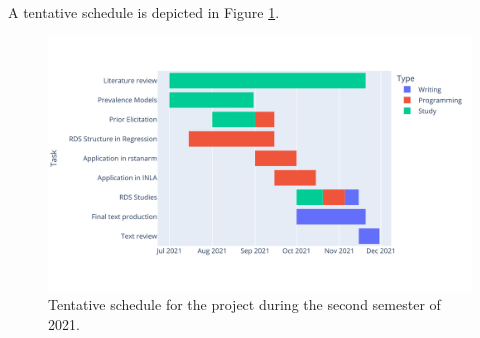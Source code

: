 A tentative schedule is depicted in Figure \ref{fig:schedule}. 

\begin{figure}[!ht]
    \centering
    \includegraphics[width = \textwidth]{../../images/gantt-chart-schedule-english.png}
    \caption{Tentative schedule for the project during the second semester of 2021.}
    \label{fig:schedule}
  \end{figure}